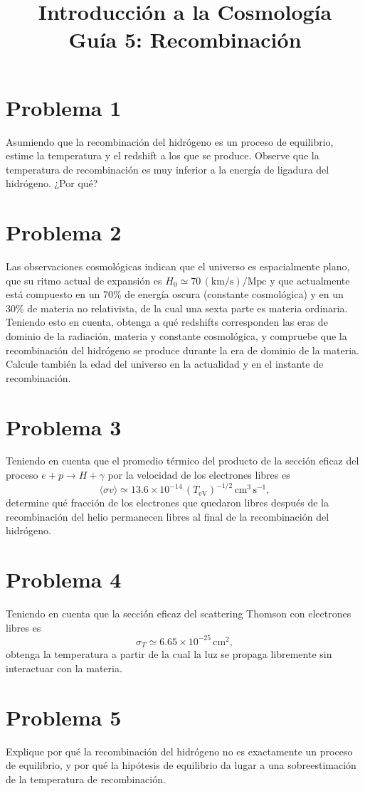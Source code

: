 \documentclass[11pt,a4paper]{article}
\title{\textbf{Introducción a la Cosmología \\ Guía 5: Recombinación}}
\date{}
\begin{document}
\maketitle

\section*{Problema 1}
Asumiendo que la recombinación del hidrógeno es un proceso de equilibrio, estime la temperatura y el redshift a los que se produce. Observe que la temperatura de recombinación es muy inferior a la energía de ligadura del hidrógeno. ¿Por qué?

\section*{Problema 2}
Las observaciones cosmológicas indican que el universo es espacialmente plano, que su ritmo actual de expansión es $H_0\simeq 70\,(\text{km/s})/\text{Mpc}$ y que actualmente está compuesto en un 70\% de energía oscura (constante cosmológica) y en un 30\% de materia no relativista, de la cual una sexta parte es materia ordinaria. Teniendo esto en cuenta, obtenga a qué redshifts corresponden las eras de dominio de la radiación, materia y constante cosmológica, y compruebe que la recombinación del hidrógeno se produce durante la era de dominio de la materia. Calcule también la edad del universo en la actualidad y en el instante de recombinación.

\section*{Problema 3}
Teniendo en cuenta que el promedio térmico del producto de la sección eficaz del proceso $e+p\rightarrow H+\gamma$ por la velocidad de los electrones libres es
\begin{equation}
  \langle\sigma v\rangle\simeq 13.6\times10^{-14}\,(T_{\text{eV}})^{-1/2}\,\text{cm}^3\,\text{s}^{-1},
\end{equation}
determine qué fracción de los electrones que quedaron libres después de la recombinación del helio permanecen libres al final de la recombinación del hidrógeno.

\section*{Problema 4}
Teniendo en cuenta que la sección eficaz del scattering Thomson con electrones libres es
\begin{equation}
  \sigma_T\simeq 6.65\times10^{-25}\,\text{cm}^2,
\end{equation}
obtenga la temperatura a partir de la cual la luz se propaga libremente sin interactuar con la materia.

\section*{Problema 5}
Explique por qué la recombinación del hidrógeno no es exactamente un proceso de equilibrio, y por qué la hipótesis de equilibrio da lugar a una sobreestimación de la temperatura de recombinación.
\end{document}

